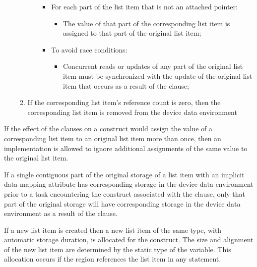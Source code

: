 \begin{enumerate}
\begin{enumerate}
\begin{enumerate}
\begin{itemize}
              \item For each part of the list item that is not an attached pointer: \begin{itemize}

                  \item The value of that part of the
                    corresponding list item is assigned to that part of the original list item;

                \end{itemize}

              \item To avoid race conditions: \begin{itemize}

                  \item Concurrent reads or updates of any part
                    of the original list item must be synchronized with the update of the
                    original list item that occurs as a result of the  clause;

                \end{itemize}


\end{itemize}
\end{enumerate}

\item If the corresponding list item's reference count is zero, then the corresponding list item is removed from the device data environment
\end{enumerate}
\end{enumerate}

\begin{note}
If the effect of the  clauses on a construct would assign the
value of a corresponding list item to an original list item more than once,
then an implementation is allowed to ignore additional assignments of
the same value to the original list item.
\end{note}

If a single contiguous part of the original storage of a list item with an
implicit data-mapping attribute has corresponding storage in the device data
environment prior to a task encountering the construct associated with the
 clause, only that part of the original storage will have
corresponding storage in the device data environment as a result of the 
clause.

\begin{ccppspecific}
If a new list item is created then a new list item of the same type, with automatic storage
duration, is allocated for the construct. The size and alignment of the new list
item are determined by the static type of the variable. This allocation occurs if the region
references the list item in any statement.
\end{ccppspecific}

